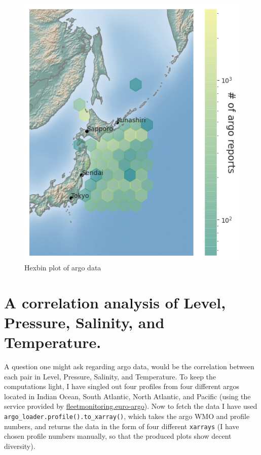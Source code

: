 \documentclass[12pt]{article}
\begin{document}
\begin{figure}[!htb]
\centering
\includegraphics[scale=0.9]{hexbin_argos_locations.png}
\caption{Hexbin plot of argo data}
\label{hexbin}
\end{figure}

\section{A correlation analysis of Level, Pressure, Salinity, 
and Temperature.}

A question one might ask regarding argo data, would be the correlation 
between each pair in Level, 
Pressure, Salinity, and Temperature. To keep the computations light, 
I have singled out four profiles from four different
argos located in Indian Ocean, South Atlantic, North Atlantic, and 
Pacific (using the service provided by 
\href{https://fleetmonitoring.euro-argo.eu/dashboard?Status=Active}{fleetmonitoring.euro-argo}). Now to fetch  
the data I have used \verb|argo_loader.profile().to_xarray()|, which 
takes the argo WMO and profile numbers, and returns the data
in the form of four different \verb|xarrays| (I have chosen profile 
numbers 
manually, so that the produced plots show decent diversity).\\
\end{document}
